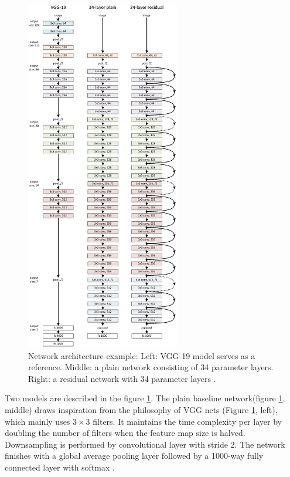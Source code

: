 \clearpage
\begin{figure}[H]
    \centering
    \includegraphics[width=0.6\textwidth]{Rohit_Master_Thesis//Images/resnet_arch.pdf}
    \caption{Network architecture example: Left: VGG-19 model serves as a reference. Middle: a plain network consisting of 34 parameter layers. Right: a residual network with 34 parameter layers \cite{he2016deep}.}
    \label{fig:resnet architecture}
\end{figure}

Two models are described in the figure \ref{fig:resnet architecture}. The plain baseline network(figure \ref{fig:resnet architecture}, middle) draws inspiration from the philosophy of VGG nets\cite{simonyan2015deepconvolutionalnetworkslargescale} (Figure \ref{fig:resnet architecture}, left), which mainly uses $3\times3$ filters. It maintains the time complexity per layer by doubling the number of filters when the feature map size is halved. Downsampling is performed by convolutional layer with stride 2. The network finishes with a global average pooling layer followed by a 1000-way fully connected layer with softmax \cite{he2016deep}.

